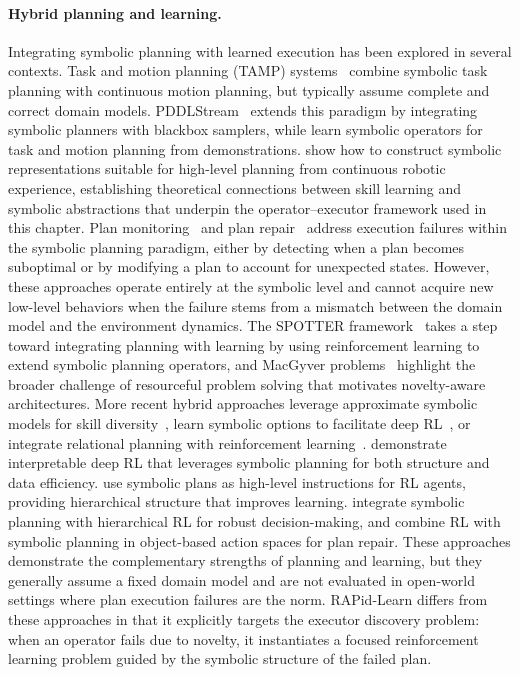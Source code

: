 \paragraph{Hybrid planning and learning.}
Integrating symbolic planning with learned execution has been explored in several contexts. Task and motion planning (TAMP) systems~\citep{garrett2021integrated,kaelbling2011hierarchical} combine symbolic task planning with continuous motion planning, but typically assume complete and correct domain models. PDDLStream~\citep{garrett2020pddlstream} extends this paradigm by integrating symbolic planners with blackbox samplers, while \citet{silver2021learning} learn symbolic operators for task and motion planning from demonstrations. \citet{konidaris2014constructing} show how to construct symbolic representations suitable for high-level planning from continuous robotic experience, establishing theoretical connections between skill learning and symbolic abstractions that underpin the operator--executor framework used in this chapter. Plan monitoring~\citep{fritz2007monitoring} and plan repair~\citep{fox2006plan} address execution failures within the symbolic planning paradigm, either by detecting when a plan becomes suboptimal or by modifying a plan to account for unexpected states. However, these approaches operate entirely at the symbolic level and cannot acquire new low-level behaviors when the failure stems from a mismatch between the domain model and the environment dynamics. The SPOTTER framework~\citep{sarathy2021spotter} takes a step toward integrating planning with learning by using reinforcement learning to extend symbolic planning operators, and MacGyver problems~\citep{sarathy2018macgyver} highlight the broader challenge of resourceful problem solving that motivates novelty-aware architectures. More recent hybrid approaches leverage approximate symbolic models for skill diversity~\citep{guan2022leveraging}, learn symbolic options to facilitate deep RL~\citep{jin2021creativity}, or integrate relational planning with reinforcement learning~\citep{kokel2021reprel}. \citet{lyu2019sdrl} demonstrate interpretable deep RL that leverages symbolic planning for both structure and data efficiency. \citet{illanes2020symbolic} use symbolic plans as high-level instructions for RL agents, providing hierarchical structure that improves learning. \citet{yang2018peorl} integrate symbolic planning with hierarchical RL for robust decision-making, and \citet{thierauf2024fixing} combine RL with symbolic planning in object-based action spaces for plan repair. These approaches demonstrate the complementary strengths of planning and learning, but they generally assume a fixed domain model and are not evaluated in open-world settings where plan execution failures are the norm. RAPid-Learn differs from these approaches in that it explicitly targets the executor discovery problem: when an operator fails due to novelty, it instantiates a focused reinforcement learning problem guided by the symbolic structure of the failed plan.

